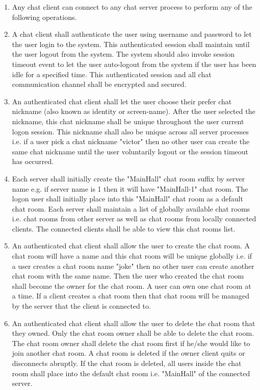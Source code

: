 \documentclass[dareport.tex]{subfiles}
\begin{document}
\begin{enumerate}[leftmargin=*]
\item Any chat client can connect to any chat server process to perform any of the following operations.

\item A chat client shall authenticate the user using username and password to let the user login to the system. This authenticated session shall maintain until the user logout from the system. The system should also invoke session timeout event to let the user auto-logout from the system if the user has been idle for a specified time. This authenticated session and all chat communication channel shall be encrypted and secured. 

\item An authenticated chat client shall let the user choose their prefer chat nickname (also known as identity or screen-name). After the user selected the nickname, this chat nickname shall be unique throughout the user current logon session. This nickname shall also be unique across all server processes i.e. if a user pick a chat nickname "victor" then no other user can create the same chat nickname until the user voluntarily logout or the session timeout has occurred.

\item Each server shall initially create the "MainHall" chat room suffix by server name e.g. if server name is 1 then it will have "MainHall-1" chat room. The logon user shall initially place into this "MainHall" chat room as a default chat room. Each server shall maintain a list of globally available chat rooms i.e. chat rooms from other server as well as chat rooms from locally connected clients. The connected clients shall be able to view this chat rooms list.

\item An authenticated chat client shall allow the user to create the chat room. A chat room will have a name and this chat room will be unique globally i.e. if a user creates a chat room name "joke" then no other user can create another chat room with the same name. Then the user who created the chat room shall become the owner for the chat room. A user can own one chat room at a time. If a client creates a chat room then that chat room will be managed by the server that the client is connected to.

\item An authenticated chat client shall allow the user to delete the chat room that they owned. Only the chat room owner shall be able to delete the chat room. The chat room owner shall delete the chat room first if he/she would like to join another chat room. A chat room is deleted if the owner client quits or disconnects abruptly. If the chat room is deleted, all users inside the chat room shall place into the default chat room i.e. "MainHall" of the connected server.


\end{enumerate}
\end{document}
